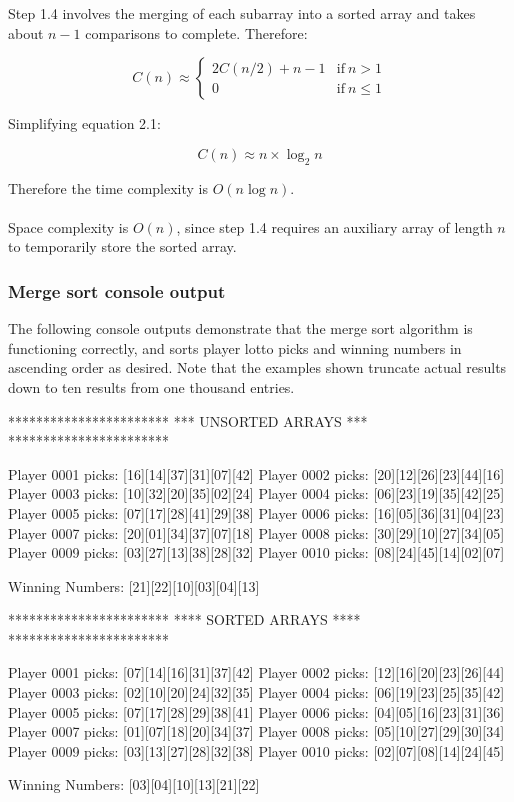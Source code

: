 Step 1.4 involves the merging of each subarray into a sorted array and takes about $n - 1$ comparisons to complete. Therefore:

\begin{equation}
C(n) \approx \left\{\begin{matrix}
2C(n/2) + n - 1 & \mbox{if} \ n > 1 \\ 
0 & \mbox{if} \ n \leq 1 
\end{matrix}\right.
\end{equation}

\newpage
\noindent
Simplifying equation 2.1:

\begin{equation}
C(n) \approx n \times \log_2n
\end{equation}

\noindent
Therefore the time complexity is $O(n \log n)$.
\\
\\
Space complexity is $O(n)$, since step 1.4 requires an auxiliary array of length $n$ to temporarily store the sorted array.

\subsubsection{Merge sort console output}

The following console outputs demonstrate that the merge sort algorithm is functioning correctly, and sorts player lotto picks and winning numbers in ascending order as desired. Note that the examples shown truncate actual results down to ten results from one thousand entries.
\\
\begin{consolecode}
***********************
*** UNSORTED ARRAYS ***
***********************

Player 0001 picks: [16][14][37][31][07][42]
Player 0002 picks: [20][12][26][23][44][16]
Player 0003 picks: [10][32][20][35][02][24]
Player 0004 picks: [06][23][19][35][42][25]
Player 0005 picks: [07][17][28][41][29][38]
Player 0006 picks: [16][05][36][31][04][23]
Player 0007 picks: [20][01][34][37][07][18]
Player 0008 picks: [30][29][10][27][34][05]
Player 0009 picks: [03][27][13][38][28][32]
Player 0010 picks: [08][24][45][14][02][07]

Winning Numbers:   [21][22][10][03][04][13]
\end{consolecode}

\begin{consolecode}
***********************
**** SORTED ARRAYS ****
***********************

Player 0001 picks: [07][14][16][31][37][42]
Player 0002 picks: [12][16][20][23][26][44]
Player 0003 picks: [02][10][20][24][32][35]
Player 0004 picks: [06][19][23][25][35][42]
Player 0005 picks: [07][17][28][29][38][41]
Player 0006 picks: [04][05][16][23][31][36]
Player 0007 picks: [01][07][18][20][34][37]
Player 0008 picks: [05][10][27][29][30][34]
Player 0009 picks: [03][13][27][28][32][38]
Player 0010 picks: [02][07][08][14][24][45]

Winning Numbers:   [03][04][10][13][21][22]
\end{consolecode}

